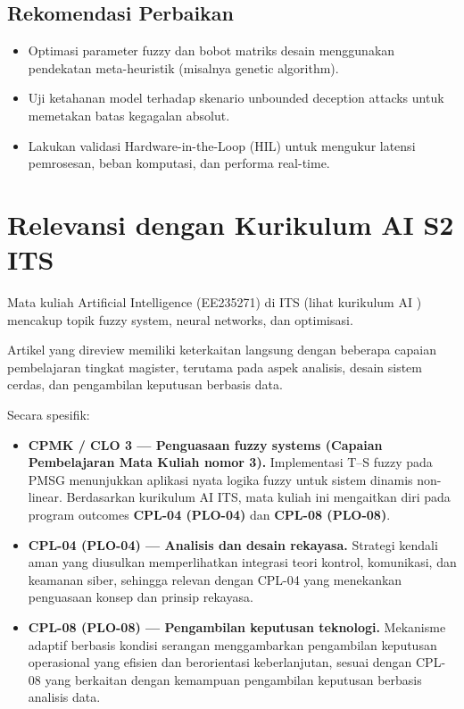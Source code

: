 \documentclass{article}
\begin{document}
\subsection*{Rekomendasi Perbaikan}

\begin{itemize}[leftmargin=*]
    \item Optimasi parameter fuzzy dan bobot matriks desain menggunakan
    pendekatan meta-heuristik (misalnya genetic algorithm).

    \item Uji ketahanan model terhadap skenario unbounded deception
    attacks untuk memetakan batas kegagalan absolut.

    \item Lakukan validasi Hardware-in-the-Loop (HIL) untuk mengukur
    latensi pemrosesan, beban komputasi, dan performa real-time.
\end{itemize}

\section*{Relevansi dengan Kurikulum AI S2 ITS}

Mata kuliah Artificial Intelligence (EE235271) di ITS (lihat kurikulum AI
\cite{kurikulum_ai_its_2026}) mencakup topik fuzzy system, neural
networks, dan optimisasi.

Artikel yang direview memiliki keterkaitan langsung dengan beberapa
capaian pembelajaran tingkat magister, terutama pada aspek analisis,
desain sistem cerdas, dan pengambilan keputusan berbasis data.

Secara spesifik:

    \begin{itemize}[leftmargin=*]
    \item \textbf{CPMK / CLO 3 — Penguasaan fuzzy systems (Capaian Pembelajaran
    Mata Kuliah nomor 3).} Implementasi T--S fuzzy pada PMSG menunjukkan
    aplikasi nyata logika fuzzy untuk sistem dinamis non-linear. Berdasarkan
    kurikulum AI ITS, mata kuliah ini mengaitkan diri pada program outcomes
    \textbf{CPL-04 (PLO-04)} dan \textbf{CPL-08 (PLO-08)}.

    \item \textbf{CPL-04 (PLO-04) — Analisis dan desain rekayasa.} Strategi
    kendali aman yang diusulkan memperlihatkan integrasi teori kontrol,
    komunikasi, dan keamanan siber, sehingga relevan dengan CPL-04 yang
    menekankan penguasaan konsep dan prinsip rekayasa.

    \item \textbf{CPL-08 (PLO-08) — Pengambilan keputusan teknologi.}
    Mekanisme adaptif berbasis kondisi serangan menggambarkan pengambilan
    keputusan operasional yang efisien dan berorientasi keberlanjutan,
    sesuai dengan CPL-08 yang berkaitan dengan kemampuan pengambilan
    keputusan berbasis analisis data.
\end{itemize}
\end{document}
